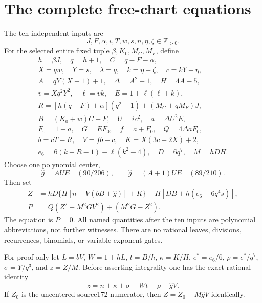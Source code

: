 \section{The complete free-chart equations}
The ten independent inputs are
\[
 J,F,\alpha,i,T,w,s,n,\eta,\zeta\in\mathbb Z_{>0}.
\]
For the selected entire fixed tuple $\beta,K_0,M_C,M_F$, define
\begin{gather*}
 h=\beta J,\quad q=h+1,\quad C=q-F-\alpha,\\
 X=qw,\quad Y=s,\quad \lambda=q,\quad k=\eta+\zeta,\quad c=kY+\eta,\\
 A=qY(X+1)+1,\quad \Delta=A^2-1,\quad H=4A-5,\\
 v=Xq^2Y^2,\quad \ell=vk,\quad E=1+\ell(\ell+k),\\
 R=[h(q-F)+\alpha](q^2-1)+(M_C+qM_F)J,\\
 B=(K_0+w)C-F,\quad U=ic^2,\quad a=\Delta U^2E,\\
 F_0=1+a,\quad G=EF_0,\quad f=a+F_0,\quad Q=4\Delta aF_0,\\
 b=cT-R,\quad V=fb-c,\quad K=X(3c-2X)+2,\\
 e_6=6(k-R-1)-\ell(k^2-4),\quad D=6q^7,\quad M=hDH.
\end{gather*}
Choose one polynomial center,
\[
 \widehat g=AUE\quad(90/206),\qquad
 \widehat g=(A+1)UE\quad(89/210).
\]
Then set
\begin{align}
 Z&=hD\{H[n-V(bB+\widehat g)]+K\}-H[DB+h(e_6-6q^4s)],\label{eq:freeZ}\\
 P&=Q(Z^2-M^2GV^2)+(M^2G-Z^2).\label{eq:freeP}
\end{align}
The equation is $P=0$. All named quantities after the ten inputs are
polynomial abbreviations, not further witnesses. There are no rational
leaves, divisions, recurrences, binomials, or variable-exponent gates.

For proof only let $L=bV$, $W=1+hL$, $t=B/h$, $\kappa=K/H$,
$e^*=e_6/6$, $\rho=e^*/q^7$, $\sigma=Y/q^3$, and $z=Z/M$.
Before asserting integrality one has the exact rational identity
\begin{equation}
 z=n+\kappa+\sigma-Wt-\rho-\widehat gV.\label{eq:freecarrier}
\end{equation}
If $Z_0$ is the uncentered source172 numerator, then
$Z=Z_0-M\widehat gV$ identically.

